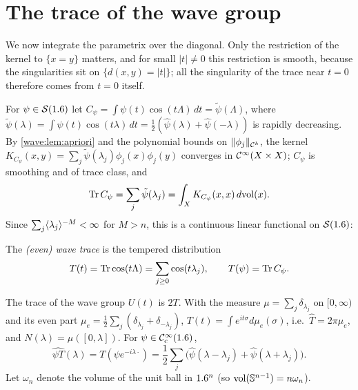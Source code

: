 \section{The trace of the wave group}\label{wave:sec:trace}

We now integrate the parametrix over the diagonal. Only the restriction of the
kernel to $\{x=y\}$ matters, and for small $|t|\ne0$ this restriction is smooth,
because the singularities sit on $\{d(x,y)=|t|\}$; all the singularity of the trace
near $t=0$ therefore comes from $t=0$ itself.

For $\psi\in\mathcal{S}(1.6)$ let
$C_\psi=\int\psi(t)\cos(t\Lambda)\,dt=\tilde\psi(\Lambda)$, where
$\tilde\psi(\lambda)=\int\psi(t)\cos(t\lambda)\,dt=\frac12(\hat\psi(\lambda)+\hat\psi(-\lambda))$ is rapidly
decreasing. By \cref{wave:lem:apriori} and the polynomial bounds on
$\lVert \phi_j\rVert_{\mathcal C^k}$, the kernel
$K_{C_\psi}(x,y)=\sum_j\tilde\psi(\lambda_j)\phi_j(x)\phi_j(y)$ converges in $\mathcal{C}^\infty(X\times X)$;
$C_\psi$ is smoothing and of trace class, and
\begin{equation*}
\operatorname{Tr} C_\psi=\sum_j\tilde\psi(\lambda_j)=\int_XK_{C_\psi}(x,x)\,d\mathrm{vol}(x).
\end{equation*}
Since $\sum_j\langle \lambda_j\rangle^{-M}<\infty$ for $M>n$, this is a continuous linear functional
on $\mathcal{S}(1.6)$:

\begin{definition}\label{wave:def:trace}
The \emph{(even) wave trace} is the tempered distribution
\begin{equation*}
T(t)=\operatorname{Tr}\cos(t\Lambda)=\sum_{j\ge0}\cos(t\lambda_j),\qquad T(\psi)=\operatorname{Tr} C_\psi .
\end{equation*}
\end{definition}

The trace of the wave group $U(t)$ is $2T$. With the measure $\mu=\sum_j\delta_{\lambda_j}$
on $[0,\infty)$ and its even part $\mu_e=\frac12\sum_j(\delta_{\lambda_j}+\delta_{-\lambda_j})$,
$T(t)=\int e^{it\sigma}d\mu_e(\sigma)$, i.e.\ $\hat T=2\pi\mu_e$, and $N(\lambda)=\mu([0,\lambda])$. For
$\psi\in\mathcal{C}^\infty_{\mathrm{c}}(1.6)$,
\begin{equation}\label{wave:eq:psiT-hat}
\widehat{\psi T}(\lambda)=T(\psi e^{-i\lambda\cdot})=\frac12\sum_j\big(\hat\psi(\lambda-\lambda_j)+\hat\psi(\lambda+\lambda_j)\big).
\end{equation}
Let $\omega_n$ denote the volume of the unit ball in $1.6^n$ (so $\operatorname{vol}(\mathbb{S}^{n-1})=n\omega_n$).

